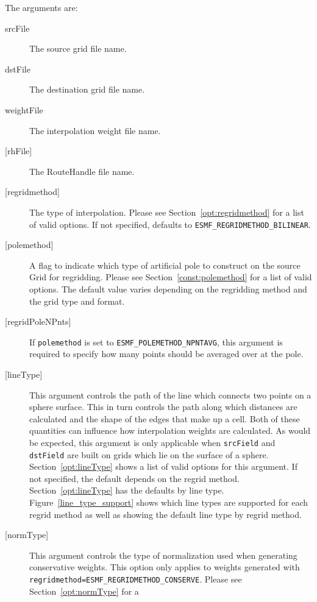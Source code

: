    The arguments are:
     \begin{description}
     \item [srcFile]
       The source grid file name.
     \item [dstFile]
       The destination grid file name.
     \item [weightFile]
       The interpolation weight file name.
     \item [{[rhFile]}]
       The RouteHandle file name.
     \item [{[regridmethod]}]
       The type of interpolation. Please see Section~\ref{opt:regridmethod}
       for a list of valid options. If not specified, defaults to
       {\tt ESMF\_REGRIDMETHOD\_BILINEAR}.
     \item [{[polemethod]}]
       A flag to indicate which type of artificial pole
       to construct on the source Grid for regridding. Please see
       Section~\ref{const:polemethod} for a list of valid options.
       The default value varies depending on the regridding method and the grid type and format.
     \item [{[regridPoleNPnts]}]
       If {\tt polemethod} is set to {\tt ESMF\_POLEMETHOD\_NPNTAVG}, this argument is required to
       specify how many points should be averaged over at the pole.
     \item [{[lineType]}]
             This argument controls the path of the line which connects two points on a sphere surface. This in
             turn controls the path along which distances are calculated and the shape of the edges that make
             up a cell. Both of these quantities can influence how interpolation weights are calculated.
             As would be expected, this argument is only applicable when {\tt srcField} and {\tt dstField} are
             built on grids which lie on the surface of a sphere. Section~\ref{opt:lineType} shows a
             list of valid options for this argument. If not specified, the default depends on the
             regrid method. Section~\ref{opt:lineType} has the defaults by line type. Figure~\ref{line_type_support} shows
             which line types are supported for each regrid method as well as showing the default line type by regrid method.
       \item [{[normType]}]
             This argument controls the type of normalization used when generating conservative weights. This option
             only applies to weights generated with {\tt regridmethod=ESMF\_REGRIDMETHOD\_CONSERVE}. Please see
             Section~\ref{opt:normType} for a

\end{description}
